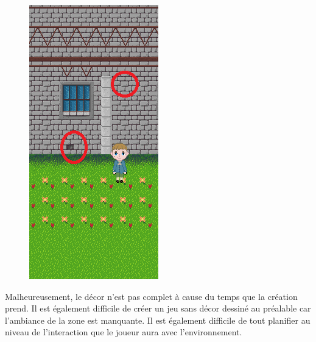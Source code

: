 \documentclass[11pt]{article}
\begin{document}
\begin{figure}[H]
\includegraphics{chateau}
\centering
\end{figure}

Malheureusement, le décor n'est pas complet à cause du temps que la création prend. Il est également difficile de créer un jeu sans décor dessiné au préalable car l'ambiance de la zone est manquante. Il est également difficile de tout planifier au niveau de l'interaction que le joueur aura avec l'environnement. \\



\end{document}
